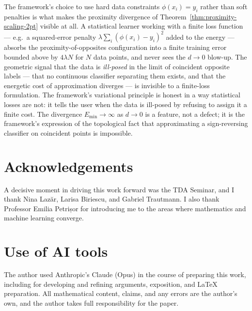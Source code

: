 \begin{remark}
\label{rem:hard-vs-soft-constraints}
The framework's choice to use hard data constraints
$\phi(x_i)=y_i$ rather than soft penalties is what makes the
proximity divergence of Theorem~\ref{thm:proximity-scaling-2pt}
visible at all. A statistical learner working with a finite loss
function --- e.g.\ a squared-error penalty
$\lambda\sum_i(\phi(x_i)-y_i)^2$ added to the energy --- absorbs the
proximity-of-opposites configuration into a finite training error
bounded above by $4\lambda N$ for $N$ data points, and never sees
the $d\to 0$ blow-up. The geometric signal that the data is
\emph{ill-posed} in the limit of coincident opposite labels --- that
no continuous classifier separating them exists, and that the
energetic cost of approximation diverges --- is invisible to a
finite-loss formulation. The framework's variational principle is
honest in a way statistical losses are not: it tells the user when
the data is ill-posed by refusing to assign it a finite cost. The
divergence $E_{\min}\to\infty$ as $d\to 0$ is a feature, not a
defect; it is the framework's expression of the topological fact
that approximating a sign-reversing classifier on coincident points
is impossible.
\end{remark}

\section*{Acknowledgements}
A decisive moment in driving this work forward was the TDA Seminar,
and I thank Nina Lazăr, Larisa Biriescu, and Gabriel Trautmann. I
also thank Professor Emilia Petrișor for introducing me to the
areas where mathematics and machine learning converge.

\section*{Use of AI tools}
The author used Anthropic's Claude (Opus) in the course of preparing
this work, including for developing and refining arguments,
exposition, and \LaTeX{} preparation. All mathematical content,
claims, and any errors are the author's own, and the author takes
full responsibility for the paper.

